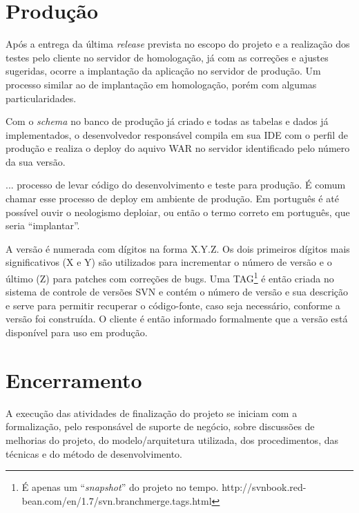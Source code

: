 \section{Produção}
\label{sec:atividadesRealizadasProdução}

Após a entrega da última \textit{release} prevista no escopo do projeto e a realização dos testes pelo cliente no servidor de homologação, já com as correções e ajustes sugeridas, ocorre a implantação da aplicação no servidor de produção. Um processo similar ao de implantação em homologação, porém com algumas particularidades.

Com o \textit{schema} no banco de produção já criado e todas as tabelas e dados já implementados, o desenvolvedor responsável compila em sua IDE com o perfil de produção e realiza o deploy do aquivo WAR no servidor identificado pelo número da sua versão.

\begin{citacao}
... processo de levar código do desenvolvimento e teste para produção. É comum chamar esse processo de deploy em ambiente de
produção. Em português é até possível ouvir o neologismo deploiar, ou então o termo correto em português, que seria ``implantar''. \cite[p.~19]{Sato2014}
\end{citacao}

A versão é numerada com dígitos na forma X.Y.Z. Os dois primeiros dígitos mais significativos (X e Y) são utilizados para incrementar o número de versão e o último (Z) para patches com correções de bugs. Uma  TAG\footnote{ É apenas um ``\textit{snapshot}'' do projeto no tempo. http://svnbook.red-bean.com/en/1.7/svn.branchmerge.tags.html} é então criada no sistema de controle de versões SVN e contém o número de versão e sua descrição e serve para permitir recuperar o código-fonte, caso seja necessário, conforme a versão foi construída. O cliente é então informado formalmente que a versão está disponível para uso em produção.

\section{Encerramento}
\label{sec:atividadesRealizadasEncerramento}

A execução das atividades de finalização do projeto se iniciam com a formalização, pelo responsável de suporte de negócio, sobre discussões de melhorias do projeto, do modelo/arquitetura utilizada, dos  procedimentos, das técnicas e do método de desenvolvimento. 


